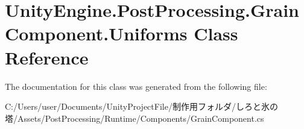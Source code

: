 \hypertarget{class_unity_engine_1_1_post_processing_1_1_grain_component_1_1_uniforms}{}\section{Unity\+Engine.\+Post\+Processing.\+Grain\+Component.\+Uniforms Class Reference}
\label{class_unity_engine_1_1_post_processing_1_1_grain_component_1_1_uniforms}


The documentation for this class was generated from the following file\+:\begin{DoxyCompactItemize}
\item 
C\+:/\+Users/user/\+Documents/\+Unity\+Project\+File/制作用フォルダ/しろと氷の塔/\+Assets/\+Post\+Processing/\+Runtime/\+Components/Grain\+Component.\+cs\end{DoxyCompactItemize}
